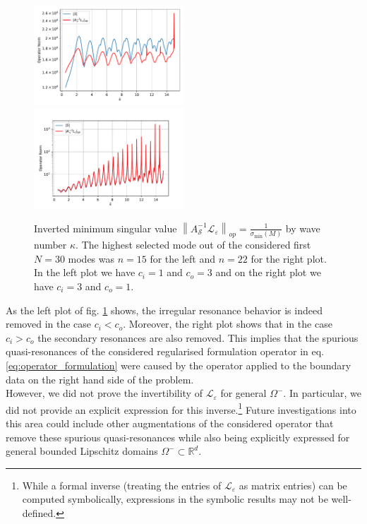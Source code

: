 \documentclass[12pt,journal,compsoc, onecolumn]{IEEEtran}
\begin{document}
\begin{figure}
    \includegraphics[width=0.5\textwidth]{simulation_scenario_10indexrange_-15.0-0.0_y_0_0.pdf}
    \includegraphics[width=0.5\textwidth]{simulation_scenario_11indexrange_-22.0-0.0_y_0_0.pdf}
    \caption{Inverted minimum singular value $\left\|A_{\mathcal{S}}^{-1}\mathcal{L}_\varepsilon\right\|_{o p} =\frac{1}{\sigma_{\min }(M)}$ by wave number $\kappa$. The highest selected mode out of the considered first $N = 30$ modes was $n = 15$ for the left and $n =22$ for the right plot.
    In the left plot we have $c_i = 1$ and $c_o = 3$
    and on the right plot we have $c_i = 3$ and $c_o = 1$. }
   \label{fig:regularised_results}
\end{figure}
\noindent
As the left plot of fig. \ref{fig:regularised_results} shows, the irregular resonance  behavior is indeed removed in the case $c_i < c_o$. Moreover, the right plot shows that in the case $c_i> c_o$ the secondary resonances are also removed. This implies that the spurious quasi-resonances of the considered regularised formulation operator in eq. \ref{eq:operator_formulation} were caused by the operator applied to the boundary data on the right hand side of the problem. \\
However, we did not prove the invertibility of $\mathcal{L}_\varepsilon$ for general $\Omega^-$. In particular, we did not provide an explicit expression for this inverse.\footnote{While a formal inverse (treating the entries of $\mathcal{L}_\varepsilon$ as matrix entries) can be computed symbolically, expressions in the symbolic results may not be well-defined.} Future investigations into this area could include other augmentations of the considered operator that remove these spurious quasi-resonances while also being explicitly expressed for general bounded Lipschitz domains $\Omega^- \subset \mathbb{R}^d$. 
\end{document}
